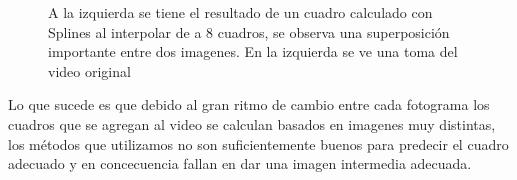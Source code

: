 \begin{figure}[H]
\centering
\begin{minipage}{0.48\textwidth}
\end{minipage}%
\hfill
\begin{minipage}{0.48\textwidth}   

\end{minipage}
\caption{\footnotesize A la izquierda se tiene el resultado de un cuadro calculado con Splines al interpolar de a 8 cuadros, se observa una superposición importante entre dos imagenes. En la izquierda se ve una toma del video original}
\end{figure}

Lo que sucede es que debido al gran ritmo de cambio entre cada fotograma los cuadros que se agregan al video se calculan basados en imagenes muy distintas, los métodos que utilizamos no son suficientemente buenos para predecir el cuadro adecuado y en concecuencia fallan en dar una imagen intermedia adecuada.

